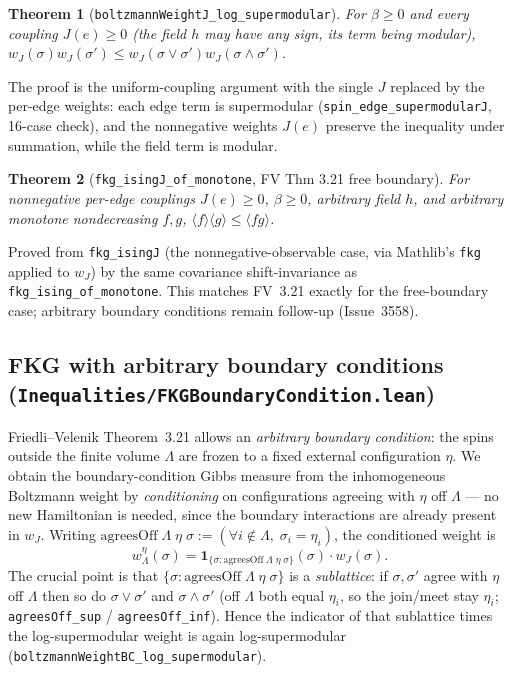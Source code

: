 \documentclass[a4paper,11pt]{article}
\newtheorem{theorem}{Theorem}
\begin{document}
\begin{theorem}[\texttt{boltzmannWeightJ\_log\_supermodular}]
For $\beta \ge 0$ and every coupling $J(e) \ge 0$ (the field $h$ may have any
sign, its term being modular),
$w_J(\sigma) w_J(\sigma') \le w_J(\sigma \vee \sigma') w_J(\sigma \wedge \sigma')$.
\end{theorem}

\noindent The proof is the uniform-coupling argument with the single $J$ replaced
by the per-edge weights: each edge term is supermodular
(\texttt{spin\_edge\_supermodularJ}, 16-case check), and the nonnegative weights
$J(e)$ preserve the inequality under summation, while the field term is modular.

\begin{theorem}[\texttt{fkg\_isingJ\_of\_monotone}, FV Thm 3.21 free boundary]
For nonnegative per-edge couplings $J(e) \ge 0$, $\beta \ge 0$, arbitrary field
$h$, and arbitrary monotone nondecreasing $f, g$,
$\langle f \rangle \langle g \rangle \le \langle fg \rangle$.
\end{theorem}

\noindent Proved from \texttt{fkg\_isingJ} (the nonnegative-observable case, via
Mathlib's \texttt{fkg} applied to $w_J$) by the same covariance shift-invariance
as \texttt{fkg\_ising\_of\_monotone}. This matches FV~3.21 exactly for the
free-boundary case; arbitrary boundary conditions remain follow-up (Issue~3558).

\subsection{FKG with arbitrary boundary conditions
(\texttt{Inequalities/FKGBoundaryCondition.lean})}

Friedli--Velenik Theorem~3.21 allows an \emph{arbitrary boundary condition}: the
spins outside the finite volume $\Lambda$ are frozen to a fixed external
configuration $\eta$. We obtain the boundary-condition Gibbs measure from the
inhomogeneous Boltzmann weight by \emph{conditioning} on configurations agreeing
with $\eta$ off $\Lambda$ --- no new Hamiltonian is needed, since the boundary
interactions are already present in $w_J$. Writing
$\mathrm{agreesOff}\;\Lambda\;\eta\;\sigma := (\forall i \notin \Lambda,\;
\sigma_i = \eta_i)$, the conditioned weight is
\[
  w^{\eta}_\Lambda(\sigma)
    = \mathbf{1}_{\{\sigma : \mathrm{agreesOff}\;\Lambda\;\eta\;\sigma\}}(\sigma)
      \cdot w_J(\sigma).
\]
The crucial point is that $\{\sigma : \mathrm{agreesOff}\;\Lambda\;\eta\;\sigma\}$
is a \emph{sublattice}: if $\sigma, \sigma'$ agree with $\eta$ off $\Lambda$ then so
do $\sigma \vee \sigma'$ and $\sigma \wedge \sigma'$ (off $\Lambda$ both equal
$\eta_i$, so the join/meet stay $\eta_i$; \texttt{agreesOff\_sup} /
\texttt{agreesOff\_inf}). Hence the indicator of that sublattice times the
log-supermodular weight is again log-supermodular
(\texttt{boltzmannWeightBC\_log\_supermodular}).
\end{document}
